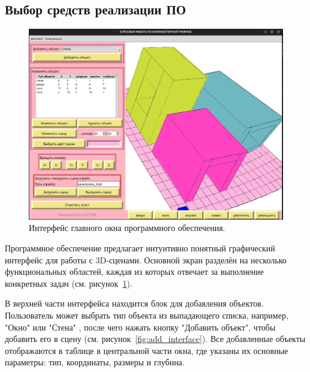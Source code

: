 \subsection{Выбор средств реализации ПО}

\begin{figure}[H]
    \centering
    \includegraphics[width=1\textwidth]{img/main_interface.png}
    \caption{Интерфейс главного окна программного обеспечения.}
    \label{fig:main_interface}
\end{figure}

Программное обеспечение предлагает интуитивно понятный графический интерфейс для работы с 3D-сценами. Основной экран разделён на несколько функциональных областей, каждая из которых отвечает за выполнение конкретных задач (см. рисунок~\ref{fig:main_interface}).

В верхней части интерфейса находится блок для добавления объектов. Пользователь может выбрать тип объекта из выпадающего списка, например, "Окно" или "Стена" , после чего нажать кнопку "Добавить объект", чтобы добавить его в сцену (см. рисунок~\ref{fig:add_interface}). Все добавленные объекты отображаются в таблице в центральной части окна, где указаны их основные параметры: тип, координаты, размеры и глубина.

